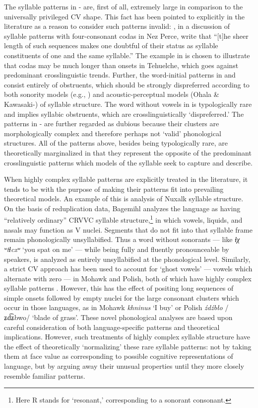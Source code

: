  The syllable patterns in - are, first of all, extremely large in comparison to the universally privileged CV shape. This fact has been pointed to explicitly in the literature as a reason to consider such patterns invalid: \citet[195]{KayeEtAl1990}, in a discussion of syllable patterns with four-consonant codas in Nez Perce, write that “[t]he sheer length of such sequences makes one doubtful of their status as syllable constituents of one and the same syllable.” The example in  is chosen to illustrate that codas may be much longer than onsets in Tehuelche, which goes against predominant crosslinguistic trends. Further, the word-initial patterns in  and  consist entirely of obstruents, which should be strongly dispreferred according to both sonority models (e.g., \citealt{Clements1990}) and acoustic-perceptual models (Ohala \& Kawasaki-\citealt{Fukumori1997}) of syllable structure. The word without vowels in  is typologically rare and implies syllabic obstruents, which are crosslinguistically ‘dispreferred.’ The patterns in - are further regarded as dubious because their clusters are morphologically complex and therefore perhaps not ‘valid’ phonological structures. All of the patterns above, besides being typologically rare, are theoretically marginalized in that they represent the opposite of the predominant crosslinguistic patterns which models of the syllable seek to capture and describe.

  When highly complex syllable patterns are explicitly treated in the literature, it tends to be with the purpose of making their patterns fit into prevailing theoretical models. An example of this is  analysis of Nuxalk syllable structure. On the basis of reduplication data, Bagemihl analyzes the language as having “relatively ordinary” CRVVC syllable structure,\footnote{{Here R stands for ‘resonant,’ corresponding to a sonorant consonant.}} in which vowels, liquids, and nasals may function as V nuclei. Segments that do not fit into that syllable frame remain phonologically unsyllabified. Thus a word without sonorants — like \textit{ɬχ ʷtɬcxʷ} ‘you spat on me’ — while being fully and fluently pronounceable by speakers, is analyzed as entirely unsyllabified at the phonological level. Similarly, a strict CV approach has been used to account for ‘ghost vowels’ — vowels which alternate with zero — in Mohawk and Polish, both of which have highly complex syllable patterns \citep{Rowicka1999}. However, this has the effect of positing long sequences of simple onsets followed by empty nuclei for the large consonant clusters which occur in those languages, as in Mohawk \textit{khninus} ‘I buy’ or Polish \textit{źdźbło} /ʑd͡ʑbwo/ ‘blade of grass’. These novel phonological analyses are based upon careful consideration of both language-specific patterns and theoretical implications. However, such treatments of highly complex syllable structure have the effect of theoretically ‘normalizing’ these rare syllable patterns: not by taking them at face value as corresponding to possible cognitive representations of language, but by arguing away their unusual properties until they more closely resemble familiar patterns.

